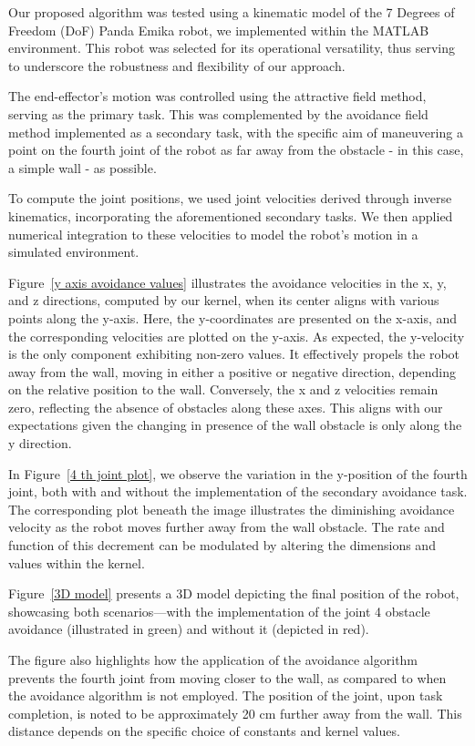 \documentclass[a4paper]{article}
\begin{document}
Our proposed algorithm was tested using a kinematic model of the 7 Degrees of Freedom (DoF) Panda Emika robot, we implemented within the MATLAB environment. This robot was selected for its operational versatility, thus serving to underscore the robustness and flexibility of our approach.

The end-effector's motion was controlled using the attractive field method, serving as the primary task. This was complemented by the avoidance field method implemented as a secondary task, with the specific aim of maneuvering a point on the fourth joint of the robot as far away from the obstacle - in this case, a simple wall - as possible.

To compute the joint positions, we used joint velocities derived through inverse kinematics, incorporating the aforementioned secondary tasks. We then applied numerical integration to these velocities to model the robot's motion in a simulated environment.

Figure~\ref{y axis avoidance values} illustrates the avoidance velocities in the x, y, and z directions, computed by our kernel, when its center aligns with various points along the y-axis. Here, the y-coordinates are presented on the x-axis, and the corresponding velocities are plotted on the y-axis. As expected, the y-velocity is the only component exhibiting non-zero values. It effectively propels the robot away from the wall, moving in either a positive or negative direction, depending on the relative position to the wall. Conversely, the x and z velocities remain zero, reflecting the absence of obstacles along these axes. This aligns with our expectations given the changing in presence of the wall obstacle is only along the y direction.

In Figure~\ref{4 th joint plot}, we observe the variation in the y-position of the fourth joint, both with and without the implementation of the secondary avoidance task. The corresponding plot beneath the image illustrates the diminishing avoidance velocity as the robot moves further away from the wall obstacle. The rate and function of this decrement can be modulated by altering the dimensions and values within the kernel.

Figure~\ref{3D model} presents a 3D model depicting the final position of the robot, showcasing both scenarios—with the implementation of the joint 4 obstacle avoidance (illustrated in green) and without it (depicted in red).

The figure also highlights how the application of the avoidance algorithm prevents the fourth joint from moving closer to the wall, as compared to when the avoidance algorithm is not employed. The position of the joint, upon task completion, is noted to be approximately 20 cm further away from the wall. This distance depends on the specific choice of constants and kernel values.
\end{document}

